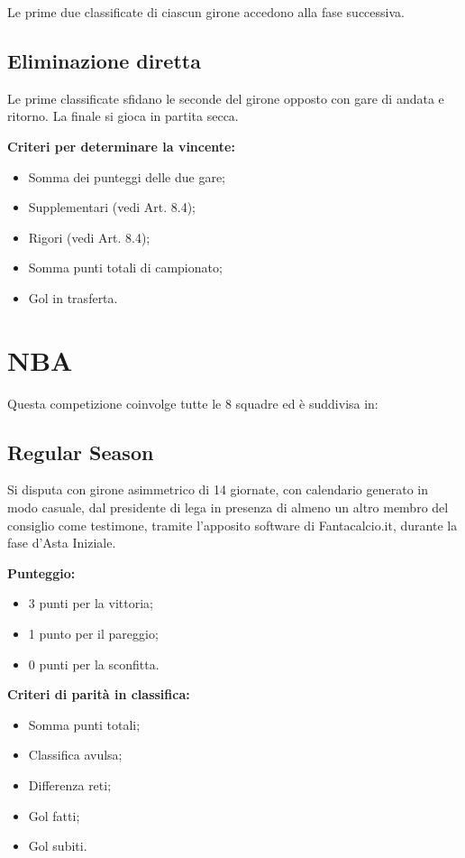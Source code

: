 \noindent
Le prime due classificate di ciascun girone accedono alla fase successiva.

\subsection{Eliminazione diretta}
\label{art:8.2.2}

Le prime classificate sfidano le seconde del girone opposto con gare di andata e ritorno. La finale si gioca in partita secca.

\noindent \textbf{Criteri per determinare la vincente:}
\begin{itemize}
  \item Somma dei punteggi delle due gare;
  \item Supplementari (vedi Art. 8.4);
  \item Rigori (vedi Art. 8.4);
  \item Somma punti totali di campionato;
  \item Gol in trasferta.
\end{itemize}

\section{NBA}
\label{art:8.3}

\noindent Questa competizione coinvolge tutte le 8 squadre ed è suddivisa in:

\subsection{Regular Season}
\label{art:8.3.1}

Si disputa con girone asimmetrico di 14 giornate, con calendario generato in modo casuale, dal presidente di lega in presenza di almeno un altro membro del consiglio come testimone, tramite l’apposito software di Fantacalcio.it, durante la fase d’Asta Iniziale.

\noindent \textbf{Punteggio:}
\begin{itemize}
  \item 3 punti per la vittoria;
  \item 1 punto per il pareggio;
  \item 0 punti per la sconfitta.
\end{itemize}

\noindent \textbf{Criteri di parità in classifica:}
\begin{itemize}
  \item Somma punti totali;
  \item Classifica avulsa;
  \item Differenza reti;
  \item Gol fatti;
  \item Gol subiti.
\end{itemize}

